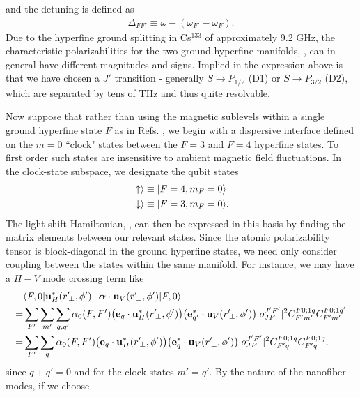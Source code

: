 \documentclass[preprint,aps,pra,onecolumn]{revtex4-1} %
\renewcommand{\tensor}[1]{\boldsymbol{#1}}
\begin{document}
and the detuning is defined as
\begin{align}
	\Delta_{FF'} \equiv \omega - (\omega_{F'} - \omega_{F}).
\end{align}
Due to the hyperfine ground splitting in Cs$^{133}$ of approximately 9.2 GHz, the characteristic 
polarizabilities for the two ground hyperfine manifolds, , can in 
general have different magnitudes and signs.  Implied in the expression above is that we have chosen a 
$J'$ transition - generally $S \rightarrow P_{1/2}$ (D1) or $S \rightarrow P_{3/2}$ (D2), which are 
separated by tens of THz and thus quite resolvable.   

Now suppose that rather than using the magnetic sublevels within a single ground hyperfine state $F$ as 
in Refs. \cite{Deutsch2010a}, we begin with a dispersive interface defined on the $m=0$ ``clock" states 
between the $F=3$ and $F=4$ hyperfine states.  To first order such states are insensitive to ambient 
magnetic field fluctuations.  In the clock-state subspace, we designate the qubit states
\begin{align} 
	\lvert{\uparrow}\rangle &\equiv \lvert{F = 4,m_F = 0}\rangle \\
 	\lvert{\downarrow}\rangle &\equiv \lvert{F = 3,m_F=0}\rangle.
\end{align}
The light shift Hamiltonian, , can then be expressed in this basis by finding 
the 
matrix elements between our relevant states.  Since the atomic polarizability tensor is block-diagonal in 
the ground hyperfine states, we need only consider coupling between the states within the same 
manifold.  
For instance, we may have a $H-V$ mode crossing term like
\begin{align} \label{eq:ClockMatrixElement}
	&\bra{F,0} \mathbf{u}^*_H(r^\prime\!_\perp, \phi') \cdot \tensor{\alpha} \cdot 
	\mathbf{u}_{V}(r^\prime\!_\perp, \phi') \ket{F,0}\nonumber\\
  =& 
	\sum_{F'} \sum_{m'} \sum_{q, q'} \alpha_0(F,F') \big( \mathbf{e}_q \cdot 
	\mathbf{u}^*_H(r^\prime\!_\perp, \phi') \big) 
	\big( \mathbf{e}^*_{q'} \cdot \mathbf{u}_V(r^\prime\!_\perp, \phi') \big) |o^{J'F'}_{JF} |^2 C^{F 0;1 
	q}_{F' m'} C^{F 
	0;1q'}_{F' m'} \\
 = & \sum_{F'} \sum_{q} \alpha_0(F,F') \big( \mathbf{e}_q \cdot \mathbf{u}^*_H(r^\prime\!_\perp, \phi') 
	\big) \big( 
	\mathbf{e}^*_{q} \cdot \mathbf{u}_V(r^\prime\!_\perp, \phi') \big) |o^{J'F'}_{JF} |^2 C^{F 0;1q}_{F' q} 
	C^{F 0;1q}_{F' q}.
\end{align}
since $q+q' = 0$ and for the clock states $m' = q'$. By the nature of the nanofiber modes, if we choose 
\end{document}
